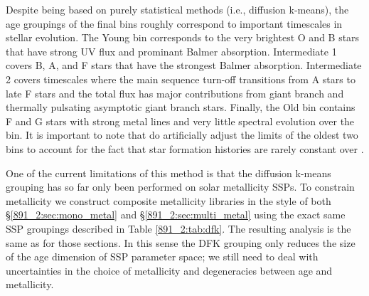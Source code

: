 Despite being based on purely statistical methods (i.e., diffusion
k-means), the age groupings of the final bins roughly correspond to
important timescales in stellar evolution. The Young bin corresponds
to the very brightest O and B stars that have strong UV flux and
prominant Balmer absorption. Intermediate 1 covers B, A, and F stars
that have the strongest Balmer absorption. Intermediate 2 covers
timescales where the main sequence turn-off transitions from A stars
to late F stars and the total flux has major contributions from giant
branch and thermally pulsating asymptotic giant branch stars. Finally,
the Old bin contains F and G stars with strong metal lines and very
little spectral evolution over the bin. It is important to note that
 do artificially adjust the limits of the oldest
two bins to account for the fact that star formation histories are
rarely constant over .





One of the current limitations of this method is that the diffusion k-means
grouping has so far only been performed on solar metallicity SSPs. To
constrain metallicity we construct composite metallicity libraries in the
style of both \S\ref{891_2:sec:mono_metal} and \S\ref{891_2:sec:multi_metal} using the
exact same SSP groupings described in Table \ref{891_2:tab:dfk}. The resulting
analysis is the same as for those sections. In this sense the DFK grouping
only reduces the size of the age dimension of SSP parameter space; we still
need to deal with uncertainties in the choice of metallicity and degeneracies
between age and metallicity.

